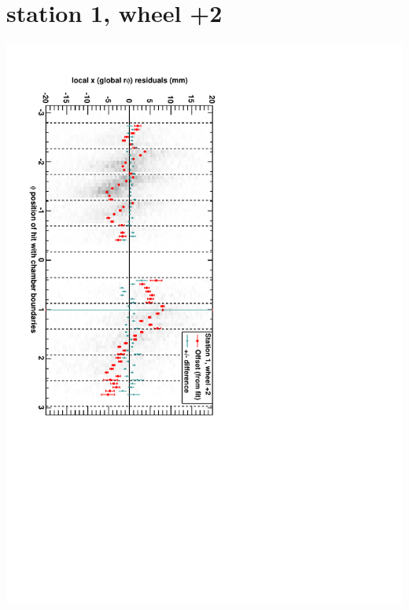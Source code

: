 \documentclass[compress]{beamer}
\begin{document}
\section*{station 1, wheel +2}
\begin{frame} \vfill \mbox{\hspace{-1 cm}\includegraphics[height=1.2\linewidth, angle=90]{DTrphiVsPhi_st1_whE.pdf}} \end{frame}
\end{document}
